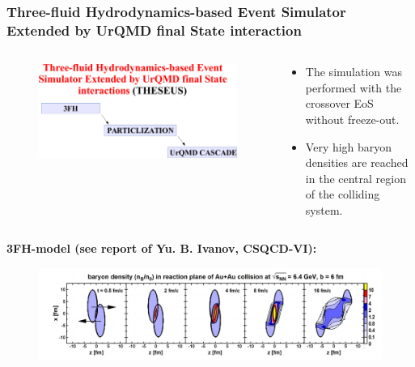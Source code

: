 \documentclass[dvipsnames] {beamer}
\begin{document}
\begin{frame}
  \frametitle{{\tiny Three-fluid Hydrodynamics-based Event Simulator Extended by UrQMD final State interaction}}
  \begin{columns}[c]
    \begin{block}{}
    \begin{figure}[H]
      \includegraphics[width=1.\textwidth]{THESEUS_model_cut.pdf}
    \end{figure}
    \end{block}
    \begin{block}{}
     {\small \bf 
      \begin{itemize}      
      \item The simulation was performed with the crossover EoS without freeze-out.
      \item Very high baryon densities are reached in the central region of the colliding system.
      \end{itemize}
      }
    \end{block}
  \end{columns}
  

  \begin{block}{\bf \centering 3FH-model (see report of Yu. B. Ivanov, CSQCD-VI):}
  \begin{figure}[H]
    \includegraphics[width=1.\textwidth]{baryon_density.jpg}
  \end{figure}
  \end{block}
\end{frame}
\end{document}
